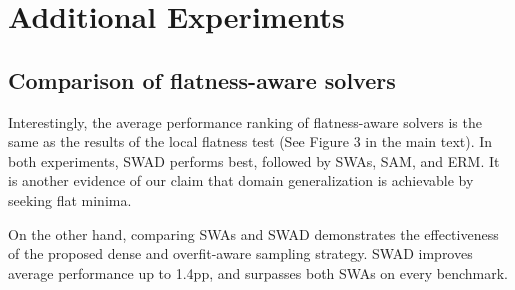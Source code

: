 


\section{Additional Experiments}

\subsection{Comparison of flatness-aware solvers}




Interestingly, the average performance ranking of flatness-aware solvers is the same as the results of the local flatness test (See Figure 3 in the main text). In both experiments, SWAD performs best, followed by SWAs, SAM, and ERM.
It is another evidence of our claim that domain generalization is achievable by seeking flat minima.

On the other hand, comparing SWAs and SWAD demonstrates the effectiveness of the proposed dense and overfit-aware sampling strategy.
SWAD improves average performance up to 1.4pp, and surpasses both SWAs on every benchmark.



